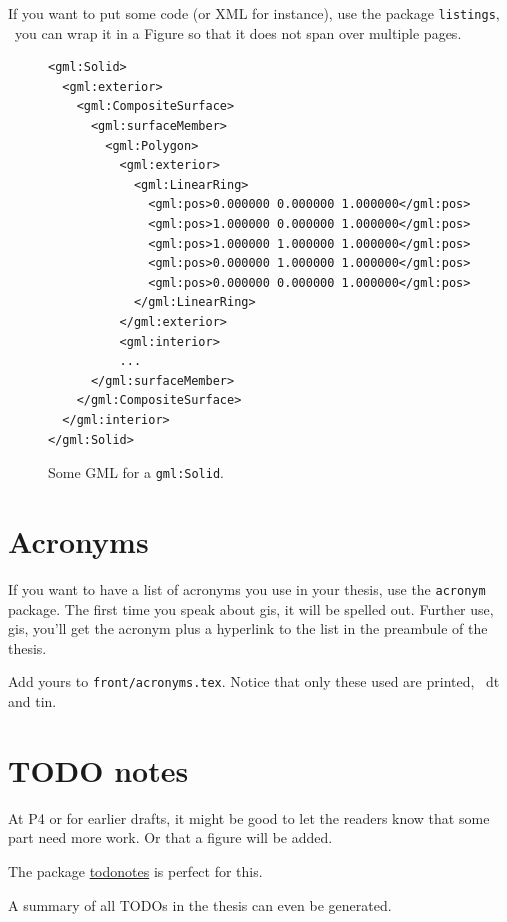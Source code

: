 If you want to put some code (or XML for instance), use the package \texttt{listings}, \eg\ you can wrap it in a Figure so that it does not span over multiple pages.
\begin{figure}
\begin{footnotesize}
\begin{lstlisting}
<gml:Solid>
  <gml:exterior>
    <gml:CompositeSurface>
      <gml:surfaceMember>
        <gml:Polygon>
          <gml:exterior>
            <gml:LinearRing>
              <gml:pos>0.000000 0.000000 1.000000</gml:pos>
              <gml:pos>1.000000 0.000000 1.000000</gml:pos>
              <gml:pos>1.000000 1.000000 1.000000</gml:pos>
              <gml:pos>0.000000 1.000000 1.000000</gml:pos>
              <gml:pos>0.000000 0.000000 1.000000</gml:pos>
            </gml:LinearRing>
          </gml:exterior>
          <gml:interior>
          ...
      </gml:surfaceMember>
    </gml:CompositeSurface>
  </gml:interior>
</gml:Solid>
\end{lstlisting}
\end{footnotesize}
\caption{Some GML for a \texttt{gml:Solid}.}%
\label{fig:codegml}
\end{figure}

%
\section{Acronyms}%
\label{sec:acronyms}

If you want to have a list of acronyms you use in your thesis, use the \texttt{acronym} package.
The first time you speak about \ac{gis}, it will be spelled out. 
Further use, \ac{gis}, you'll get the acronym plus a hyperlink to the list in the preambule of the thesis.

Add yours to \texttt{front/acronyms.tex}.
Notice that only these used are printed, \eg\ \ac{dt} and \ac{tin}.


%
\section{TODO notes}%
\label{sec:todo}

At P4 or for earlier drafts, it might be good to let the readers know that some part need more work.
Or that a figure will be added.

The package \href{http://tug.ctan.org/macros/latex/contrib/todonotes/todonotes.pdf}{todonotes} is perfect for this.

A summary of all TODOs in the thesis can even be generated.

